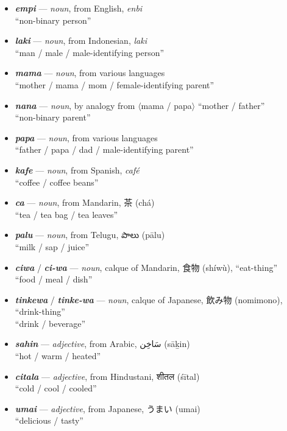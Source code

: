 \documentclass[a4paper, titlepage]{article}
\begin{document}
\begin{itemize}
	\item \textbf{\textit{empi}} — \textit{noun}, from English, \textit{enbi} \\``non-binary person''
	\item \textbf{\textit{laki}} — \textit{noun}, from Indonesian, \textit{laki} \\``man / male / male-identifying person''
	\item \textbf{\textit{mama}} — \textit{noun}, from various languages \\``mother / mama / mom / female-identifying parent''
	\item \textbf{\textit{nana}} — \textit{noun}, by analogy from $\langle$mama / papa$\rangle$ ``mother / father'' \\``non-binary parent''
	\item \textbf{\textit{papa}} — \textit{noun}, from various languages \\``father / papa / dad / male-identifying parent''
	\item \textbf{\textit{kafe}} — \textit{noun}, from Spanish, \textit{café} \\``coffee / coffee beans''
	\item \textbf{\textit{ca}} — \textit{noun}, from Mandarin, 茶 (chá) \\``tea / tea bag / tea leaves''
	\item \textbf{\textit{palu}} — \textit{noun}, from Telugu, {\tlgfont పాలు} (pālu) \\``milk / sap / juice''
	\item \textbf{\textit{ciwa}} / \textbf{\textit{ci-wa}} — \textit{noun}, calque of Mandarin, 食物 (shíwù), ``eat-thing'' \\``food / meal / dish''
	\item \textbf{\textit{tinkewa}}  / \textbf{\textit{tinke-wa}} — \textit{noun}, calque of Japanese, 飲み物 (nomimono), ``drink-thing'' \\``drink / beverage''
	\item \textbf{\textit{sahin}} — \textit{adjective}, from Arabic, {\afont  سَاخِن } (sāḵin) \\``hot / warm / heated''
	\item \textbf{\textit{citala}} — \textit{adjective}, from Hindustani, {\hmfont शीतल} (śītal) \\``cold / cool / cooled''
	\item \textbf{\textit{umai}} — \textit{adjective}, from Japanese, うまい (umai) \\``delicious / tasty''

\end{itemize}
\end{document}
